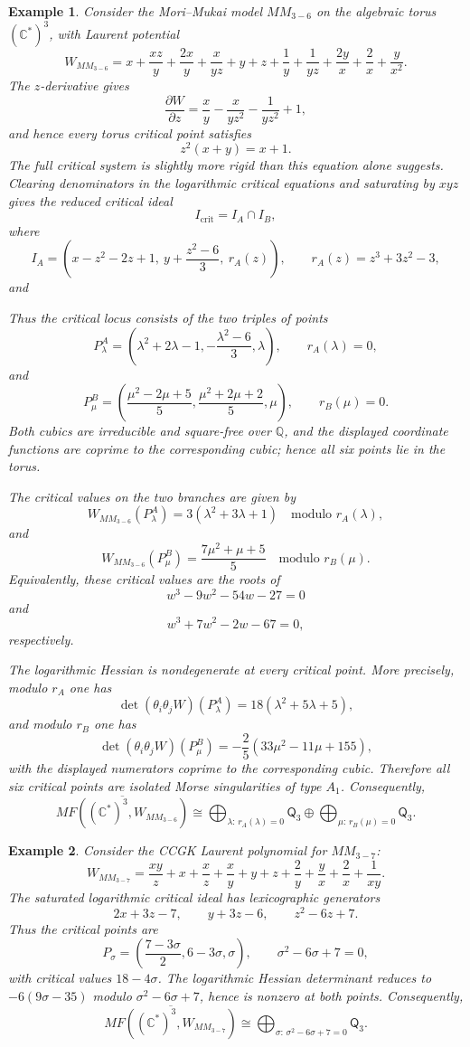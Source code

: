 \documentclass[11pt]{amsart}
\newtheorem{example}{Example}[section]
\newcommand{\MorseCat}[1]{\mathsf{Q}_{#1}}
\newcommand{\fitdisplay}[1]{%
  \begin{center}%
  \resizebox{\textwidth}{!}{$\displaystyle #1$}%
  \end{center}%
}
\begin{document}
\begin{example}
Consider the Mori--Mukai model $MM_{3-6}$ on the algebraic torus
$(\mathbb{C}^*)^3$, with Laurent potential
\[
W_{MM_{3-6}}=x+\frac{xz}{y}+\frac{2x}{y}+\frac{x}{yz}
+y+z+\frac{1}{y}+\frac{1}{yz}
+\frac{2y}{x}+\frac{2}{x}+\frac{y}{x^2}.
\]
The $z$-derivative gives
\[
\frac{\partial W}{\partial z}
=\frac{x}{y}-\frac{x}{yz^2}-\frac{1}{yz^2}+1,
\]
and hence every torus critical point satisfies
\[
z^2(x+y)=x+1.
\]
The full critical system is slightly more rigid than this equation alone
suggests. Clearing denominators in the logarithmic critical equations and
saturating by $xyz$ gives the reduced critical ideal
\[
I_{\mathrm{crit}}=I_A\cap I_B,
\]
where
\[
I_A=\left(
x-z^2-2z+1,
\ y+\frac{z^2-6}{3},
\ r_A(z)
\right),
\qquad
r_A(z)=z^3+3z^2-3,
\]
and
\fitdisplay{I_B=\left(
x-\frac{z^2-2z+5}{5},
\ y-\frac{z^2+2z+2}{5},
\ r_B(z)
\right),
\qquad
r_B(z)=z^3+z^2+4z+5}
Thus the critical locus consists of the two triples of points
\[
P^A_\lambda=\left(
\lambda^2+2\lambda-1,
-\frac{\lambda^2-6}{3},
\lambda
\right),
\qquad
r_A(\lambda)=0,
\]
and
\[
P^B_\mu=\left(
\frac{\mu^2-2\mu+5}{5},
\frac{\mu^2+2\mu+2}{5},
\mu
\right),
\qquad
r_B(\mu)=0.
\]
Both cubics are irreducible and square-free over $\mathbb{Q}$, and the
displayed coordinate functions are coprime to the corresponding cubic; hence
all six points lie in the torus.

The critical values on the two branches are given by
\[
W_{MM_{3-6}}(P^A_\lambda)=3(\lambda^2+3\lambda+1)
\quad\text{modulo }r_A(\lambda),
\]
and
\[
W_{MM_{3-6}}(P^B_\mu)=\frac{7\mu^2+\mu+5}{5}
\quad\text{modulo }r_B(\mu).
\]
Equivalently, these critical values are the roots of
\[
w^3-9w^2-54w-27=0
\]
and
\[
w^3+7w^2-2w-67=0,
\]
respectively.

The logarithmic Hessian is nondegenerate at every critical point. More
precisely, modulo $r_A$ one has
\[
\det(\theta_i\theta_jW)(P^A_\lambda)
=18(\lambda^2+5\lambda+5),
\]
and modulo $r_B$ one has
\[
\det(\theta_i\theta_jW)(P^B_\mu)
=-\frac{2}{5}(33\mu^2-11\mu+155),
\]
with the displayed numerators coprime to the corresponding cubic. Therefore
all six critical points are isolated Morse singularities of type $A_1$.
Consequently,
\[
\overline{MF((\mathbb{C}^*)^3,W_{MM_{3-6}})}
\cong \bigoplus_{\lambda:\,r_A(\lambda)=0}\MorseCat{3} \oplus \bigoplus_{\mu:\,r_B(\mu)=0}\MorseCat{3}.
\]
\end{example}

\begin{example}
Consider the CCGK Laurent polynomial for $MM_{3-7}$:
\[
W_{MM_{3-7}}
=\frac{xy}{z}+x+\frac{x}{z}+\frac{x}{y}+y+z
+\frac2y+\frac yx+\frac2x+\frac1{xy}.
\]
The saturated logarithmic critical ideal has lexicographic generators
\[
2x+3z-7,
\qquad y+3z-6,
\qquad z^2-6z+7.
\]
Thus the critical points are
\[
P_\sigma=\left(\frac{7-3\sigma}{2},6-3\sigma,\sigma\right),
\qquad \sigma^2-6\sigma+7=0,
\]
with critical values $18-4\sigma$. The logarithmic Hessian determinant reduces
to $-6(9\sigma-35)$ modulo $\sigma^2-6\sigma+7$, hence is nonzero at both
points. Consequently,
\[
\overline{MF((\mathbb{C}^*)^3,W_{MM_{3-7}})}
\cong \bigoplus_{\sigma:\,\sigma^2-6\sigma+7=0}\MorseCat{3}.
\]
\end{example}
\end{document}

